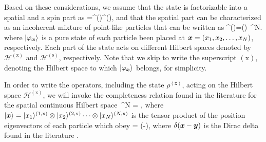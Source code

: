 Based on these considerations, we assume that the state is factorizable into a spatial and a spin part as
\be
\label{eq:gm-separated-internal-and-external}
\rho=\rho^{()}\otimes\rho^{()},
\ee
and that the spatial part can be characterized as an incoherent mixture of point-like particles that can be written as
\be
  \rho^{()}=\int \prob() \,^N.
  \label{eq:gm-pre-thermal-state}
\ee
where $\vert{\varphi_{\ensuremath{\boldsymbol{x}}}}\rangle$ is a pure state of each particle been placed at $\boldsymbol{x}=(x_1,x_2,\dots,x_N)$, respectively.
Each part of the state acts on different Hilbert spaces denoted by $\mathcal{H}^{(\text{x})}$ and $\mathcal{H}^{(\text{s})}$, respectively.
Note that we skip to write the superscript $(\text{x})$, denoting the Hilbert space to which $\vert{\varphi_{\ensuremath{\boldsymbol{x}}}}\rangle$ belongs, for simplicity.

In order to write the operators, including the state $\rho^{(\text{x})}$, acting on the Hilbert space $\mathcal{H}^{(\text{x})}$, we will invoke the completeness relation found in the literature \citep{Sakurai2010, Cohen-Tannoudji1977} for the spatial continuous Hilbert space
\be
  \int {}\,^N = \mtxid,
\ee
where $\vert{\ensuremath{\boldsymbol{x}}}\rangle=\vert{x_1}\rangle^{(1,\text{x})}\otimes\vert{x_2}\rangle^{(2,\text{x})}\cdots\otimes\vert{x_N}\rangle^{(N,\text{x})}$ is the tensor product of the position eigenvectors of each particle which obey
\be
   = \delta(-),
\ee
where $\delta(\boldsymbol{x}-\boldsymbol{y})$ is the Dirac delta found in the literature \citep{Sakurai2010, Cohen-Tannoudji1977}.

